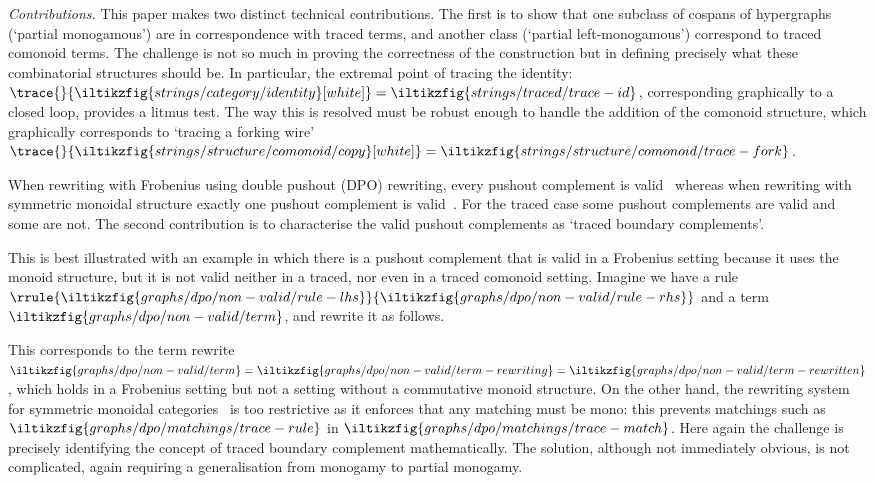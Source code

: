 \emph{Contributions.}
This paper makes two distinct technical contributions.
The first is to show that one subclass of cospans of hypergraphs (`partial
monogamous') are in correspondence with traced terms, and another class
(`partial left-monogamous') correspond to traced comonoid terms.
The challenge is not so much in proving the correctness of the construction but
in defining precisely what these combinatorial structures should be.
In particular, the extremal point of tracing the identity: \(
    \trace{}{
        \iltikzfig{strings/category/identity}[white]
    }
    =
    \iltikzfig{strings/traced/trace-id}
\), corresponding graphically to a closed loop, provides a litmus test.
The way this is resolved must be robust enough to handle the addition of the
comonoid structure, which graphically corresponds to `tracing a forking wire' \(
    \trace{}{
        \iltikzfig{strings/structure/comonoid/copy}[white]
    }
    =
    \iltikzfig{strings/structure/comonoid/trace-fork}
\).

When rewriting with Frobenius using double pushout (DPO) rewriting, every
pushout complement is valid~\cite{bonchi2022string} whereas when rewriting with
symmetric monoidal structure exactly one pushout complement is
valid~\cite{bonchi2022stringa}.
For the traced case some pushout complements are valid and some are not.
The second contribution is to characterise the valid pushout complements as
`traced boundary complements'.

This is best illustrated with an example in which there is a pushout
complement that is valid in a Frobenius setting because it uses the monoid
structure, but it is not valid neither in a traced, nor even in a traced
comonoid setting.
Imagine we have a rule \(\rrule{
    \iltikzfig{graphs/dpo/non-valid/rule-lhs}
}{
    \iltikzfig{graphs/dpo/non-valid/rule-rhs}
}\) and a term \(
    \iltikzfig{graphs/dpo/non-valid/term}
\), and rewrite it as follows.
\begin{center}
    
\end{center}
This corresponds to the term rewrite \(
    \iltikzfig{graphs/dpo/non-valid/term}
    =
    \iltikzfig{graphs/dpo/non-valid/term-rewriting}
    =
    \iltikzfig{graphs/dpo/non-valid/term-rewritten}
\), which holds in a Frobenius setting but not a setting without a commutative
monoid structure.
On the other hand, the rewriting system for symmetric monoidal
categories~\cite{bonchi2022stringa} is too restrictive as it enforces that any
matching must be mono: this prevents matchings such as \(
    \iltikzfig{graphs/dpo/matchings/trace-rule}
\) in \(
    \iltikzfig{graphs/dpo/matchings/trace-match}
\).
Here again the challenge is precisely identifying the concept of traced boundary
complement mathematically.
The solution, although not immediately obvious, is not complicated, again
requiring a generalisation from monogamy to partial monogamy.
